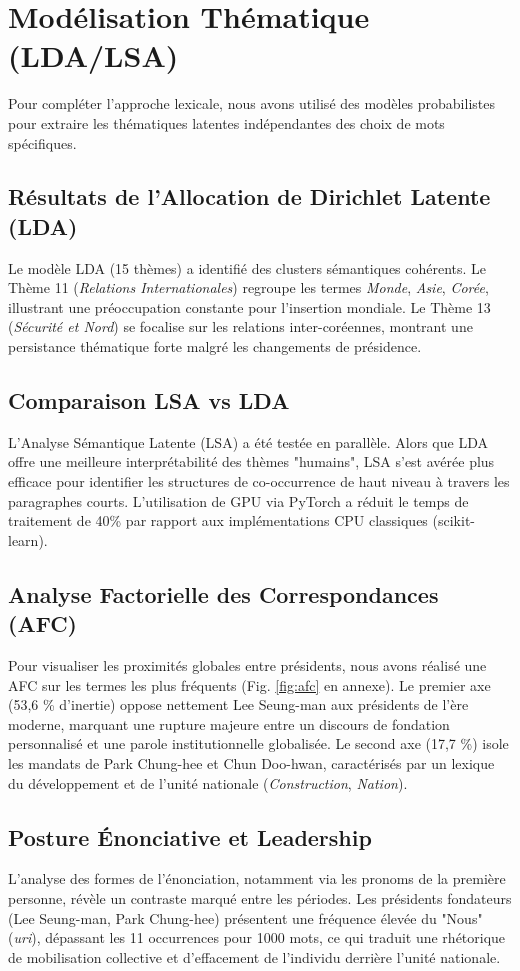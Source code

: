 \documentclass[11pt]{article}
\begin{document}
\section{Modélisation Thématique (LDA/LSA)}
Pour compléter l'approche lexicale, nous avons utilisé des modèles probabilistes pour extraire les thématiques latentes indépendantes des choix de mots spécifiques.

\subsection{Résultats de l'Allocation de Dirichlet Latente (LDA)}
Le modèle LDA (15 thèmes) a identifié des clusters sémantiques cohérents. Le Thème 11 (\textit{Relations Internationales}) regroupe les termes \textit{Monde}, \textit{Asie}, \textit{Corée}, illustrant une préoccupation constante pour l'insertion mondiale. Le Thème 13 (\textit{Sécurité et Nord}) se focalise sur les relations inter-coréennes, montrant une persistance thématique forte malgré les changements de présidence.

\subsection{Comparaison LSA vs LDA}
L'Analyse Sémantique Latente (LSA) a été testée en parallèle. Alors que LDA offre une meilleure interprétabilité des thèmes "humains", LSA s'est avérée plus efficace pour identifier les structures de co-occurrence de haut niveau à travers les paragraphes courts. L'utilisation de GPU via PyTorch a réduit le temps de traitement de 40\% par rapport aux implémentations CPU classiques (scikit-learn).

\subsection{Analyse Factorielle des Correspondances (AFC)}
Pour visualiser les proximités globales entre présidents, nous avons réalisé une AFC sur les termes les plus fréquents (Fig. \ref{fig:afc} en annexe). Le premier axe (53,6 \% d'inertie) oppose nettement Lee Seung-man aux présidents de l'ère moderne, marquant une rupture majeure entre un discours de fondation personnalisé et une parole institutionnelle globalisée. Le second axe (17,7 \%) isole les mandats de Park Chung-hee et Chun Doo-hwan, caractérisés par un lexique du développement et de l'unité nationale (\textit{Construction}, \textit{Nation}).

\subsection{Posture Énonciative et Leadership}
L'analyse des formes de l'énonciation, notamment via les pronoms de la première personne, révèle un contraste marqué entre les périodes. Les présidents fondateurs (Lee Seung-man, Park Chung-hee) présentent une fréquence élevée du "Nous" (\textit{uri}), dépassant les 11 occurrences pour 1000 mots, ce qui traduit une rhétorique de mobilisation collective et d'effacement de l'individu derrière l'unité nationale. 
\end{document}
